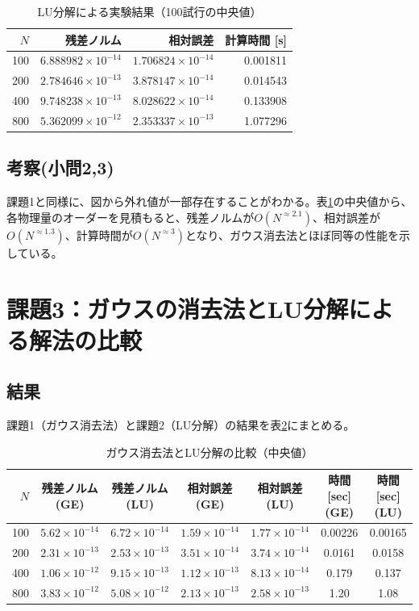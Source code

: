\documentclass[a4paper,11pt]{ltjsarticle}
\begin{document}
\begin{table}[H]
\centering
\caption{LU分解による実験結果（100試行の中央値）}
\label{tab:exp2_summary}
\begin{tabular}{r|r|r|r}
\hline
$N$ & 残差ノルム & 相対誤差 & 計算時間 [s] \\
\hline
100 & $6.888982\times10^{-14}$ & $1.706824\times10^{-14}$ & 0.001811 \\
200 & $2.784646\times10^{-13}$ & $3.878147\times10^{-14}$ & 0.014543 \\
400 & $9.748238\times10^{-13}$ & $8.028622\times10^{-14}$ & 0.133908 \\
800 & $5.362099\times10^{-12}$ & $2.353337\times10^{-13}$ & 1.077296 \\
\hline
\end{tabular}
\end{table}
\subsection{考察(小問2,3)}
課題1と同様に、図から外れ値が一部存在することがわかる。表\ref{tab:exp2_summary}の中央値から、各物理量のオーダーを見積もると、残差ノルムが$O(N^{\approx 2.1})$、相対誤差が$O(N^{\approx 1.3})$、計算時間が$O(N^{\approx 3})$となり、ガウス消去法とほぼ同等の性能を示している。

\section{課題3：ガウスの消去法とLU分解による解法の比較}
\subsection{結果}
課題1（ガウス消去法）と課題2（LU分解）の結果を表\ref{tab:compare_elim_lu}にまとめる。

\begin{table}[H]
\centering
\caption{ガウス消去法とLU分解の比較（中央値）}
\label{tab:compare_elim_lu}
\begin{tabular}{r|cc|cc|cc}
\hline
$N$ & 残差ノルム(GE) & 残差ノルム(LU) & 相対誤差(GE) & 相対誤差(LU) & 時間[sec](GE) & 時間[sec](LU) \\
\hline
100 & $5.62\times10^{-14}$ & $6.72\times10^{-14}$ & $1.59\times10^{-14}$ & $1.77\times10^{-14}$ & 0.00226 & 0.00165 \\
200 & $2.31\times10^{-13}$ & $2.53\times10^{-13}$ & $3.51\times10^{-14}$ & $3.74\times10^{-14}$ & 0.0161 & 0.0158 \\
400 & $1.06\times10^{-12}$ & $9.15\times10^{-13}$ & $1.12\times10^{-13}$ & $8.13\times10^{-14}$ & 0.179 & 0.137 \\
800 & $3.83\times10^{-12}$ & $5.08\times10^{-12}$ & $2.13\times10^{-13}$ & $2.58\times10^{-13}$ & 1.20 & 1.08 \\
\hline
\end{tabular}
\end{table}
\end{document}
